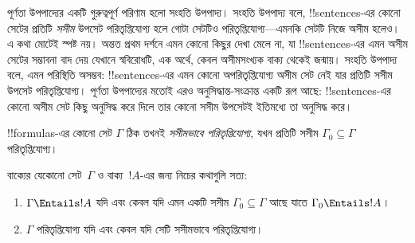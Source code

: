 \documentclass[../../../include/open-logic-section]{subfiles}
\begin{document}
      {}
      {}


পূর্ণতা উপপাদ্যের একটি গুরুত্বপূর্ণ পরিণাম হলো সংহতি উপপাদ্য। সংহতি
উপপাদ্য বলে, !!{sentence}s-এর কোনো সেটের প্রতিটি \emph{সসীম} উপসেট
পরিতৃপ্তিযোগ্য হলে গোটা সেটটিও পরিতৃপ্তিযোগ্য—এমনকি সেটটি নিজে অসীম হলেও।
এ কথা মোটেই স্পষ্ট নয়। অন্তত প্রথম দর্শনে এমন কোনো কিছুর দেখা মেলে না,
যা !!{sentence}s-এর এমন অসীম সেটের সম্ভাবনা বাদ দেয় যেখানে স্ববিরোধটি,
এক অর্থে, কেবল অসীমসংখ্যক বাক্য থেকেই জন্মায়। সংহতি উপপাদ্য বলে, এমন
পরিস্থিতি অসম্ভব: !!{sentence}s-এর এমন কোনো অপরিতৃপ্তিযোগ্য অসীম সেট নেই
যার প্রতিটি সসীম উপসেট পরিতৃপ্তিযোগ্য। পূর্ণতা উপপাদ্যের মতোই এরও
অনুসিদ্ধান্ত-সংক্রান্ত একটি রূপ আছে: !!{sentence}s-এর কোনো অসীম সেট কিছু
অনুসিদ্ধ করে দিলে তার কোনো সসীম উপসেটই ইতিমধ্যে তা অনুসিদ্ধ করে।

\begin{defn}
  !!{formula}s-এর কোনো সেট $\Gamma$ ঠিক তখনই \emph{সসীমভাবে
  পরিতৃপ্তিযোগ্য}, যখন প্রতিটি সসীম $\Gamma_0 \subseteq \Gamma$
  পরিতৃপ্তিযোগ্য।
\end{defn}

\begin{thm}[সংহতি উপপাদ্য]
বাক্যের যেকোনো সেট~$\Gamma$ ও বাক্য~$!A$-এর জন্য নিচের কথাগুলি
সত্য:
\begin{enumerate}
  \item $\Gamma \Entails !A$ যদি এবং কেবল যদি এমন একটি সসীম
    $\Gamma_0 \subseteq \Gamma$ আছে যাতে $\Gamma_0 \Entails !A$।
  \item $\Gamma$ পরিতৃপ্তিযোগ্য যদি এবং কেবল যদি সেটি সসীমভাবে
    পরিতৃপ্তিযোগ্য।
\end{enumerate}
\end{thm}
\end{document}
